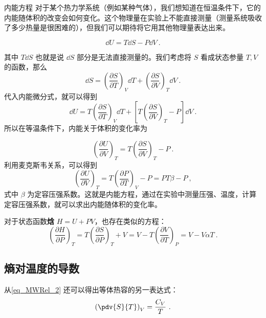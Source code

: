 \begin{example}{内能方程}
对于某个热力学系统（例如某种气体），我们想知道在恒温条件下，它的内能随体积的改变会如何变化。这个物理量在实验上不能直接测量（测量系统吸收了多少热量是很困难的），但我们可以期待将它用其他物理量表达出来。

\begin{equation}
\dd U=T\dd S-P\dd V~.
\end{equation}

其中 $T\dd S$ 也就是说 $\dd S$ 部分是无法直接测量的。我们考虑将 $S$ 看成状态参量 $T,V$ 的函数，那么 
\begin{equation}
\dd S=\left(\frac{\partial S}{\partial T}\right)_V \dd T+\left(\frac{\partial S}{\partial V}\right)_T \dd V~.
\end{equation}
代入内能微分式，就可以得到
\begin{equation}\label{eq_MWRel_2}
\dd U=T\left(\frac{\partial S}{\partial T}\right)_V\dd T+\left[T\left(\frac{\partial S}{\partial V}\right)_T-P\right]\dd V~.
\end{equation}
所以在等温条件下，内能关于体积的变化率为

\begin{equation}
\left(\frac{\partial U}{\partial V}\right)_T=T\left(\frac{\partial S}{\partial V}\right)_T-P~.
\end{equation}
利用麦克斯韦关系，可以得到
\begin{equation}
\left(\frac{\partial U}{\partial V}\right)_T=T\left(\frac{\partial P}{\partial T}\right)_V-P=PT\beta-P~,
\end{equation}
式中 $\beta$ 为定容压强系数。这就是内能方程，通过在实验中测量压强、温度，计算定容压强系数，就可以求出内能随体积的变化率。

对于状态函数\textbf{焓} $H=U+PV$，也存在类似的方程：
\begin{equation}\label{eq_MWRel_3}
\left(\frac{\partial H}{\partial P}\right)_T=T\left(\frac{\partial S}{\partial P}\right)_T+V
=V-T\left(\frac{\partial V}{\partial T}\right)_P=V-V\alpha T~.
\end{equation}

\end{example}

\subsection{熵对温度的导数}
从\autoref{eq_MWRel_2} 还可以得出等体热容的另一表达式：
\begin{equation}
\left(\pdv{S}{T}\right)_V=\frac{C_V}{T}~.
\end{equation}

